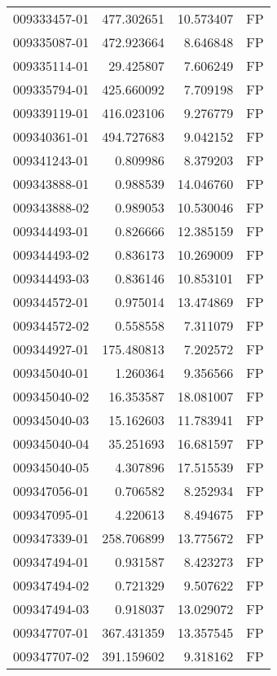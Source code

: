 \begin{tabular}{lrrl}
009333457-01 &  477.302651 &      10.573407 &   FP \\
009335087-01 &  472.923664 &       8.646848 &   FP \\
009335114-01 &   29.425807 &       7.606249 &   FP \\
009335794-01 &  425.660092 &       7.709198 &   FP \\
009339119-01 &  416.023106 &       9.276779 &   FP \\
009340361-01 &  494.727683 &       9.042152 &   FP \\
009341243-01 &    0.809986 &       8.379203 &   FP \\
009343888-01 &    0.988539 &      14.046760 &   FP \\
009343888-02 &    0.989053 &      10.530046 &   FP \\
009344493-01 &    0.826666 &      12.385159 &   FP \\
009344493-02 &    0.836173 &      10.269009 &   FP \\
009344493-03 &    0.836146 &      10.853101 &   FP \\
009344572-01 &    0.975014 &      13.474869 &   FP \\
009344572-02 &    0.558558 &       7.311079 &   FP \\
009344927-01 &  175.480813 &       7.202572 &   FP \\
009345040-01 &    1.260364 &       9.356566 &   FP \\
009345040-02 &   16.353587 &      18.081007 &   FP \\
009345040-03 &   15.162603 &      11.783941 &   FP \\
009345040-04 &   35.251693 &      16.681597 &   FP \\
009345040-05 &    4.307896 &      17.515539 &   FP \\
009347056-01 &    0.706582 &       8.252934 &   FP \\
009347095-01 &    4.220613 &       8.494675 &   FP \\
009347339-01 &  258.706899 &      13.775672 &   FP \\
009347494-01 &    0.931587 &       8.423273 &   FP \\
009347494-02 &    0.721329 &       9.507622 &   FP \\
009347494-03 &    0.918037 &      13.029072 &   FP \\
009347707-01 &  367.431359 &      13.357545 &   FP \\
009347707-02 &  391.159602 &       9.318162 &   FP \\

\end{tabular}
